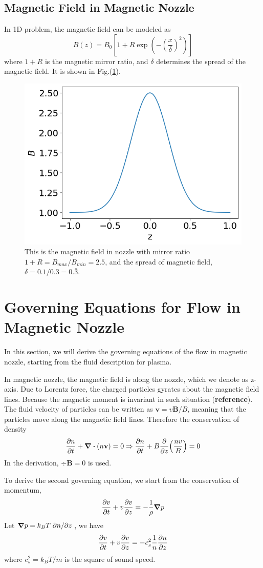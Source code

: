 \subsection{Magnetic Field in Magnetic Nozzle}
In 1D problem, the magnetic field can be modeled as
\[ B(z) = B_0 \left[1 + R\exp(-\left(\frac{x}{\delta}\right)^2)\right] \]
where $1+R$ is the magnetic mirror ratio, and $\delta$ determines the spread of the magnetic field. It is shown in Fig.(\ref{fig:magnetic-field}).
\begin{figure}[H]
	\centering
	\includegraphics[width=0.7\linewidth]{figures/magnetic-field}
	\caption{This is the magnetic field in nozzle with mirror ratio $1+R=B_{max}/B_{min}=2.5$, and the spread of magnetic field, $\delta=0.1/0.3=0.\bar{3}$. }
	\label{fig:magnetic-field}
\end{figure}

\section{Governing Equations for Flow in Magnetic Nozzle}
In this section, we will derive the governing equations of the flow in magnetic nozzle, starting from the fluid description for plasma.

In magnetic nozzle, the magnetic field is along the nozzle, which we denote as z-axis. Due to Lorentz force, the charged particles gyrates about the magnetic field lines. Because the magnetic moment is invariant in such situation (\textbf{reference}). The fluid velocity of particles can be written as $\mathbf{v} = v\mathbf{B}/B$, meaning that the particles move along the magnetic field lines. Therefore the conservation of density 
\[ 
\pdv{n}{t} + \div(n\mathbf{v}) = 0 
\Rightarrow 
\pdv{n}{t} + B\pdv{z}(\frac{nv}{B}) = 0  
\]
In the derivation, $\div{\mathbf{B}} = 0$ is used.

To derive the second governing equation, we start from the conservation of momentum, 
\[ \pdv{v}{t} + v\pdv{v}{z} = -\frac{1}{\rho}\grad{p} \]
Let $\grad{p} = k_BT\pdv*{n}{z}$, we have
\[ \pdv{v}{t} + v\pdv{v}{z} = -c_s^2\frac{1}{n}\pdv{n}{z} \]
where $c_s^2 = k_BT/m$ is the square of sound speed.

